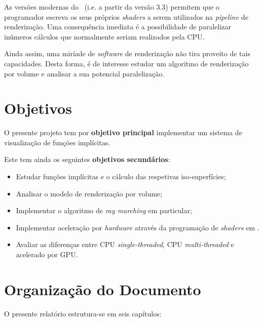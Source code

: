 As versões modernas do \opengl~(i.e. a partir da versão 3.3) permitem que o programador escreva os seus próprios \textit{shaders} a serem utilizados na \textit{pipeline} de renderização. Uma consequência imediata é a possibilidade de paralelizar inúmeros cálculos que normalmente seriam realizados pela \ac{CPU}.

Ainda assim, uma miríade de \textit{software} de renderização não tira proveito de tais capacidades. Desta forma, é de interesse estudar um algoritmo de renderização por volume e analisar a sua potencial paralelização.


\section{Objetivos}
\label{sec::intro:objetivos}

O presente projeto tem por \textbf{objetivo principal} implementar um sistema de visualização de funções implícitas.

Este tem ainda os seguintes \textbf{objetivos secundários}:
\begin{itemize}
	\item Estudar funções implícitas e o cálculo das respetivas iso-superfícies;
	\item Analisar o modelo de renderização por volume;
	\item Implementar o algoritmo de \textit{ray marching} em particular;
	\item Implementar aceleração por \textit{hardware} através da programação de \emph{shaders} em \opengl.
    \item Avaliar as diferenças entre \ac{CPU} \textit{single-threaded}, \ac{CPU} \textit{multi-threaded} e acelerado por \ac{GPU}.
\end{itemize}


\section{Organização do Documento}
\label{sec::intro:orgdoc}

O presente relatório estrutura-se em seis capítulos:

